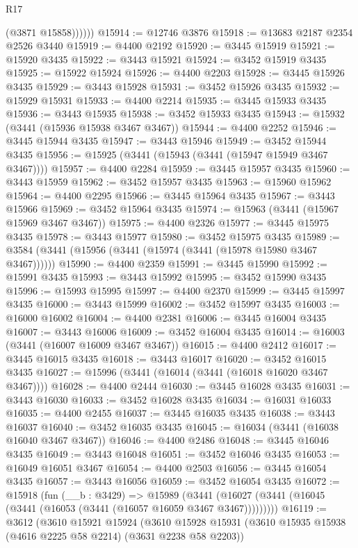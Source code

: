 \begin{lexlean}{R17}
\begin{coremodule}
              (@3871 @15858))))))
@15914 := @12746 @3876
@15918 := @13683 @2187 @2354 @2526 @3440
@15919 := @4400 @2192
@15920 := @3445 @15919
@15921 := @15920 @3435
@15922 := @3443 @15921
@15924 := @3452 @15919 @3435
@15925 := @15922 @15924
@15926 := @4400 @2203
@15928 := @3445 @15926 @3435
@15929 := @3443 @15928
@15931 := @3452 @15926 @3435
@15932 := @15929 @15931
@15933 := @4400 @2214
@15935 := @3445 @15933 @3435
@15936 := @3443 @15935
@15938 := @3452 @15933 @3435
@15943 := @15932 (@3441 (@15936 @15938 @3467 @3467))
@15944 := @4400 @2252
@15946 := @3445 @15944 @3435
@15947 := @3443 @15946
@15949 := @3452 @15944 @3435
@15956 := @15925 (@3441 (@15943 (@3441 (@15947 @15949 @3467 @3467))))
@15957 := @4400 @2284
@15959 := @3445 @15957 @3435
@15960 := @3443 @15959
@15962 := @3452 @15957 @3435
@15963 := @15960 @15962
@15964 := @4400 @2295
@15966 := @3445 @15964 @3435
@15967 := @3443 @15966
@15969 := @3452 @15964 @3435
@15974 := @15963 (@3441 (@15967 @15969 @3467 @3467))
@15975 := @4400 @2326
@15977 := @3445 @15975 @3435
@15978 := @3443 @15977
@15980 := @3452 @15975 @3435
@15989 := @3584 (@3441 (@15956 (@3441 (@15974 (@3441 (@15978 @15980 @3467 @3467))))))
@15990 := @4400 @2359
@15991 := @3445 @15990
@15992 := @15991 @3435
@15993 := @3443 @15992
@15995 := @3452 @15990 @3435
@15996 := @15993 @15995
@15997 := @4400 @2370
@15999 := @3445 @15997 @3435
@16000 := @3443 @15999
@16002 := @3452 @15997 @3435
@16003 := @16000 @16002
@16004 := @4400 @2381
@16006 := @3445 @16004 @3435
@16007 := @3443 @16006
@16009 := @3452 @16004 @3435
@16014 := @16003 (@3441 (@16007 @16009 @3467 @3467))
@16015 := @4400 @2412
@16017 := @3445 @16015 @3435
@16018 := @3443 @16017
@16020 := @3452 @16015 @3435
@16027 := @15996 (@3441 (@16014 (@3441 (@16018 @16020 @3467 @3467))))
@16028 := @4400 @2444
@16030 := @3445 @16028 @3435
@16031 := @3443 @16030
@16033 := @3452 @16028 @3435
@16034 := @16031 @16033
@16035 := @4400 @2455
@16037 := @3445 @16035 @3435
@16038 := @3443 @16037
@16040 := @3452 @16035 @3435
@16045 := @16034 (@3441 (@16038 @16040 @3467 @3467))
@16046 := @4400 @2486
@16048 := @3445 @16046 @3435
@16049 := @3443 @16048
@16051 := @3452 @16046 @3435
@16053 := @16049 @16051 @3467
@16054 := @4400 @2503
@16056 := @3445 @16054 @3435
@16057 := @3443 @16056
@16059 := @3452 @16054 @3435
@16072 := @15918
    (fun (__b : @3429) =>
    @15989 (@3441 (@16027 (@3441 (@16045 (@3441 (@16053 (@3441 (@16057 @16059 @3467 @3467)))))))))
@16119 := @3612
    (@3610
      @15921
      @15924
      (@3610
        @15928
        @15931
        (@3610 @15935 @15938 (@4616 @2225 @58 @2214) (@3631 @2238 @58 @2203))

\end{coremodule}
\end{lexlean}
